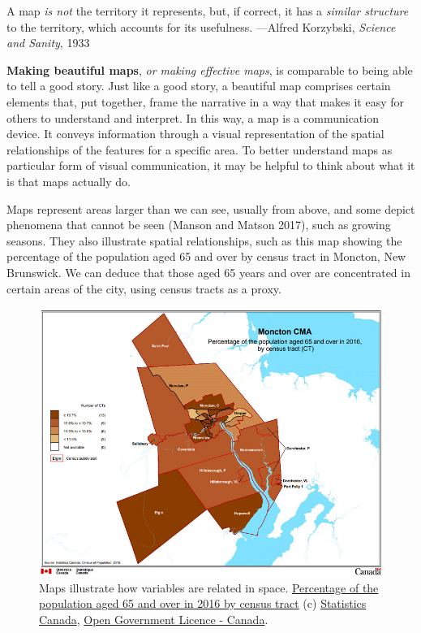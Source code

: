 \documentclass[
]{book}
\begin{document}
A map \emph{is not} the territory it represents, but, if correct, it has a \emph{similar structure} to the territory, which accounts for its usefulness.
---Alfred Korzybski, \emph{Science and Sanity}, 1933

\textbf{Making beautiful maps}, \emph{or making effective maps}, is comparable to being able to tell a good story. Just like a good story, a beautiful map comprises certain elements that, put together, frame the narrative in a way that makes it easy for others to understand and interpret. In this way, a map is a communication device. It conveys information through a visual representation of the spatial relationships of the features for a specific area. To better understand maps as particular form of visual communication, it may be helpful to think about what it is that maps actually do.

Maps represent areas larger than we can see, usually from above, and some depict phenomena that cannot be seen (Manson and Matson 2017), such as growing seasons. They also illustrate spatial relationships, such as this map showing the percentage of the population aged 65 and over by census tract in Moncton, New Brunswick. We can deduce that those aged 65 years and over are concentrated in certain areas of the city, using census tracts as a proxy.

\begin{figure}
\centering
\includegraphics{images/17-moncton.png}
\caption{Maps illustrate how variables are related in space. \href{https://www12.statcan.gc.ca/census-recensement/2016/geo/map-carte/ref/thematic-thematiques/as/files-fichiers/map-carte-5/2016-92173-002-305-013-02-00-eng.pdf}{Percentage of the population aged 65 and over in 2016 by census tract} (c) \href{https://www-statcan-gc-ca.eu1.proxy.openathens.net/eng/about/about?MM=as}{Statistics Canada}, \href{https://open.canada.ca/en/open-government-licence-canada}{Open Government Licence - Canada}.}
\end{figure}
\end{document}
